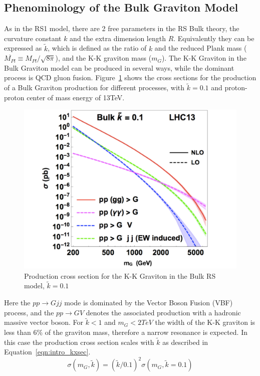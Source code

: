 \subsection{Phenominology of the Bulk Graviton Model}
As in the RS1 model, there are 2 free parameters in the RS Bulk theory, the curvature constant $k$ and the extra dimension length $R$. Equivalently they can be expressed as $\tilde{k}$, which is defined as the ratio of $k$ and the reduced Plank mass ($\overline{M_{Pl}}\equiv M_{Pl}/\sqrt{8\pi}$), and the K-K graviton mass ($m_{G}$). The K-K Graviton in the Bulk Graviton model can be produced in several ways, while the dominant process is QCD gluon fusion. Figure~\ref{fig:intro_Gxsec} shows the cross sections for the production of a Bulk Graviton production for different processes, with $\tilde{k}=0.1$ and proton-proton center of mass energy of 13TeV.
\begin{figure}[htbp]
\begin{center}
\includegraphics[width=0.5\linewidth]{figures/intro_Gxsec.pdf}
\caption{Production cross section for the K-K Graviton in the Bulk RS model, $\tilde{k}=0.1$}
\label{fig:intro_Gxsec}
\end{center}
\end{figure}
Here the $pp\rightarrow Gjj$ mode is dominated by the Vector Boson Fusion (VBF) process, and the $pp\rightarrow GV$ denotes the associated production with a hadronic massive vector boson. For $\tilde{k}<1$ and $m_{G}<2 TeV$ the width of the K-K graviton is less than 6\% of the graviton mass, therefore a narrow resonance is expected. In this case the production cross section scales with $\tilde{k}$ as described in Equation~\ref{eqn:intro_kxsec}.
\begin{equation}
\sigma (m_G,\tilde{k}) = (\tilde{k}/0.1)^2 \sigma (m_G,\tilde{k}=0.1)
\label{eqn:intro_kxsec}
\end{equation}

